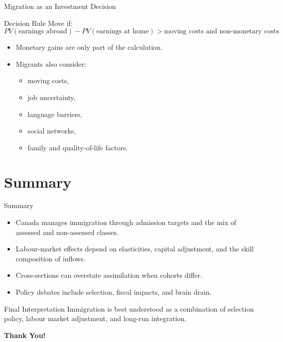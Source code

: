 \documentclass[aspectratio=169]{beamer}
\begin{document}
\begin{frame}{Migration as an Investment Decision}
\transfade
\begin{block}{Decision Rule}
Move if:
\[
PV(\text{earnings abroad}) - PV(\text{earnings at home}) > \text{moving costs and non-monetary costs}
\]
\end{block}

\begin{itemize}
  \item Monetary gains are only part of the calculation.
  \item Migrants also consider:
  \begin{itemize}
    \item moving costs,
    \item job uncertainty,
    \item language barriers,
    \item social networks,
    \item family and quality-of-life factors.
  \end{itemize}
\end{itemize}
\end{frame}

\section{Summary}

\begin{frame}{Summary}
\transfade
\begin{itemize}
  \item Canada manages immigration through admission targets and the mix of assessed and non-assessed classes.
  \item Labour-market effects depend on elasticities, capital adjustment, and the skill composition of inflows.
  \item Cross-sections can overstate assimilation when cohorts differ.
  \item Policy debates include selection, fiscal impacts, and brain drain.
\end{itemize}

\begin{block}{Final Interpretation}
Immigration is best understood as a combination of selection policy, labour market adjustment, and long-run integration.
\end{block}
\end{frame}

\begin{frame}
\centering
\Huge{\textbf{Thank You!}}
\end{frame}
\end{document}
